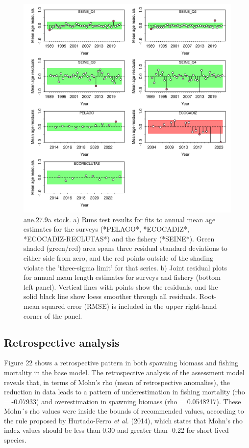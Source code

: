 \documentclass[
]{article}
\begin{document}
\begin{figure}[H]

{\centering \includegraphics[width=0.95\linewidth]{report/run/S1.0_4FLEETS/fig_runtest_residuals_age} 

}

\caption{ane.27.9a stock. a) Runs test results for fits to annual mean age estimates for the surveys (*PELAGO*, *ECOCADIZ*, *ECOCADIZ-RECLUTAS*) and the fishery (*SEINE*). Green shaded (green/red) area spans three residual standard deviations to either side from zero, and the red points outside of the shading violate the 'three-sigma limit' for that series.  b) Joint residual plots for annual mean length estimates for surveys and fishery (bottom left panel).  Vertical lines with points show the residuals, and the solid black line show loess smoother through all residuals. Root-mean squared error (RMSE) is included in the upper right-hand corner of the panel.}\label{fig:unnamed-chunk-28}
\end{figure}

\hypertarget{retrospective-analysis}{%
\subsection{Retrospective analysis}\label{retrospective-analysis}}

Figure 22 shows a retrospective pattern in both spawning biomass and
fishing mortality in the base model. The retrospective analysis of the
assessment model reveals that, in terms of Mohn's rho (mean of
retrospective anomalies), the reduction in data leads to a pattern of
underestimation in fishing mortality (rho = -0.07933) and overestimation
in spawning biomass (rho = 0.0548217). These Mohn´s rho values were
inside the bounds of recommended values, according to the rule proposed
by Hurtado-Ferro \emph{et al.} (2014), which states that Mohn's rho
index values should be less than 0.30 and greater than -0.22 for
short-lived species.
\end{document}
